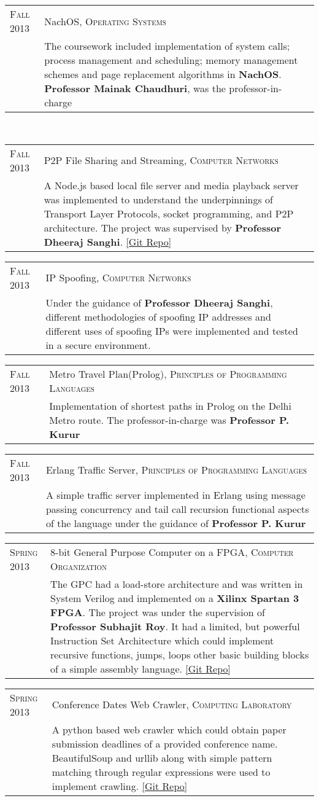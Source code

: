 \documentclass[a4paper,10pt]{article} %
\newcommand{\project}[3]{
    \begin{tabular}{>{\raggedleft}p{2.2cm}|p{15cm}}
        \textsc{#1} & #2 \\
                    & \footnotesize{#3} \\
    \end{tabular}
}
\begin{document}
\project {Fall 2013}
         {NachOS, \textsc{Operating Systems}}
         {The coursework included implementation of system calls; process
          management and scheduling; memory management schemes and page replacement
          algorithms in \textbf{NachOS}. \textbf{Professor Mainak Chaudhuri}, was
          the professor-in-charge}\\

\project {Fall 2013}
         {P2P File Sharing and Streaming, \textsc{Computer Networks}}
         {A Node.js based local file server and media playback server was implemented
          to understand the underpinnings of Transport Layer Protocols, socket programming,
          and P2P architecture.  The project was supervised by \textbf{Professor Dheeraj Sanghi}.
          \href{https://github.com/srijanshetty/nodesock} {[Git Repo]}}

\project {Fall 2013}
         {IP Spoofing, \textsc{Computer Networks}}
         {Under the guidance of \textbf{Professor Dheeraj Sanghi}, different methodologies
          of spoofing IP addresses and different uses of spoofing IPs were implemented and tested
          in a secure environment.}

\project {Fall 2013}
         {Metro Travel Plan(Prolog), \textsc{Principles of Programming Languages}}
         {Implementation of shortest paths in Prolog on the Delhi Metro route.
          The professor-in-charge was \textbf{Professor P. Kurur}}

\project {Fall 2013}
         {Erlang Traffic Server, \textsc{Principles of Programming Languages}}
         {A simple traffic server implemented in Erlang using message passing
          concurrency and tail call recursion functional aspects of the language under the
          guidance of \textbf{Professor P. Kurur}}

\project {Spring 2013}
         {8-bit General Purpose Computer on a FPGA, \textsc{Computer Organization}}
         {The GPC had a load-store architecture and was written in System Verilog and
          implemented on a \textbf{Xilinx Spartan 3 FPGA}.  The project was under the
          supervision of \textbf{Professor Subhajit Roy}.  It had a limited, but powerful
          Instruction Set Architecture which could implement recursive functions, jumps,
          loops  other basic building blocks of a simple assembly language.
          \href{https://github.com/srijanshetty/220_y11} {[Git Repo]}}

\project {Spring 2013}
         {Conference Dates Web Crawler, \textsc{Computing Laboratory}}
         {A python based web crawler which could obtain paper submission
          deadlines of a provided conference name.  BeautifulSoup and urllib along
          with simple pattern matching through regular expressions were used to implement crawling.
          \href{https://github.com/srijanshetty/crawler} {[Git Repo]}}
\end{document}
